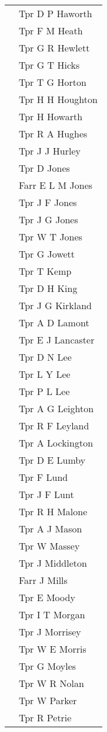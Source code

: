 \begin{center}
\begin{tabular}{rl}
    & Tpr D P Haworth \\
    & Tpr F M Heath \\
    & Tpr G R Hewlett \\
    & Tpr G T Hicks \\
    & Tpr T G Horton \\
    & Tpr H H Houghton \\
    & Tpr H Howarth \\
    & Tpr R A Hughes \\
    & Tpr J J Hurley \\
    & Tpr D Jones \\
    & Farr E L M Jones \\
    & Tpr J F Jones \\
    & Tpr J G Jones \\
    & Tpr W T Jones \\
    & Tpr G Jowett \\
    & Tpr T Kemp \\
    & Tpr D H King \\
    & Tpr J G Kirkland \\
    & Tpr A D Lamont \\
    & Tpr E J Lancaster \\
    & Tpr D N Lee \\
    & Tpr L Y Lee \\
    & Tpr P L Lee \\
    & Tpr A G Leighton \\
    & Tpr R F Leyland \\
    & Tpr A Lockington \\
    & Tpr D E Lumby \\
    & Tpr F Lund \\
    & Tpr J F Lunt \\
    & Tpr R H Malone \\
    & Tpr A J Mason \\
    & Tpr W Massey \\
    & Tpr J Middleton \\
    & Farr J Mills \\
    & Tpr E Moody \\
    & Tpr I T Morgan \\
    & Tpr J Morrisey \\
    & Tpr W E Morris \\
    & Tpr G Moyles \\
    & Tpr W R Nolan \\
    & Tpr W Parker \\
    & Tpr R Petrie \\

\end{tabular}
\end{center}

